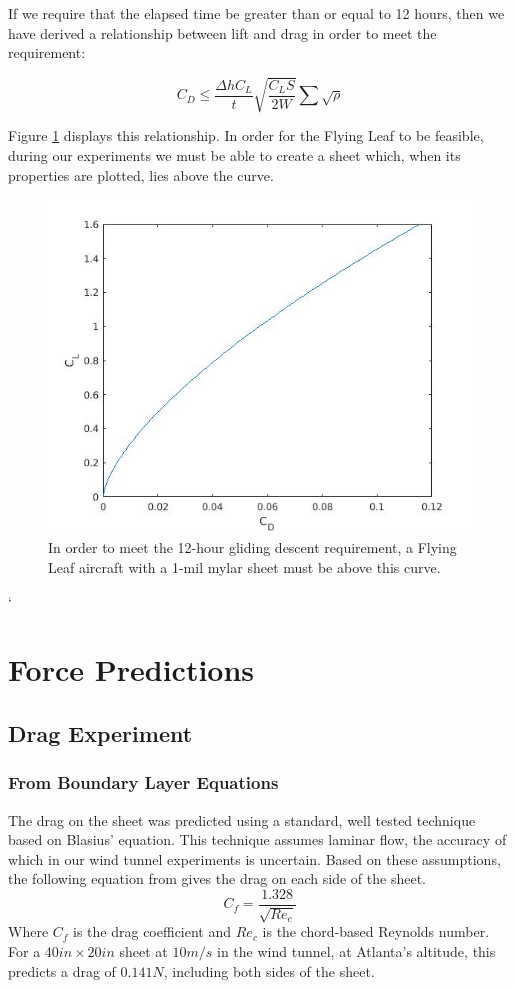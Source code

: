 \documentclass[12pt]{report} %
\begin{document}
If we require that the elapsed time be greater than or equal to 12 hours, then we have derived a relationship between lift and
drag in order to meet the requirement:

\[C_D \leq \frac{\Delta h C_L}{t}\sqrt{\frac{C_L S}{2W}} \sum\sqrt{\rho}\]

Figure \ref{requirements} displays this relationship. In order for the Flying Leaf to be feasible, during our experiments we must be
able to create a sheet which, when its properties are plotted, lies above the curve.

\begin{figure}
\includegraphics[width = 0.7\linewidth]{requirements.jpg}
\centering
\caption{In order to meet the 12-hour gliding descent requirement, a Flying Leaf aircraft with a 1-mil mylar sheet must be above this curve.}
\label{requirements}
\end{figure}
`
\section{Force Predictions}

\subsection{Drag Experiment}
\subsubsection{From Boundary Layer Equations}
The drag on the sheet was predicted using a standard, well tested technique based on Blasius' equation. This technique assumes laminar flow,
the accuracy of which in our wind tunnel experiments is uncertain. Based on these assumptions, the following equation from \cite{Anderson} gives
the drag on each side of the sheet.
\[ C_f = \frac{1.328}{\sqrt{Re_c}} \]
Where $C_f$ is the drag coefficient and $Re_c$ is the chord-based Reynolds number. For a $40 in \times 20 in$ sheet at $10 m/s$ in the wind
tunnel, at Atlanta's altitude, this predicts a drag of $0.141 N$, including both sides of the sheet.
\end{document}
